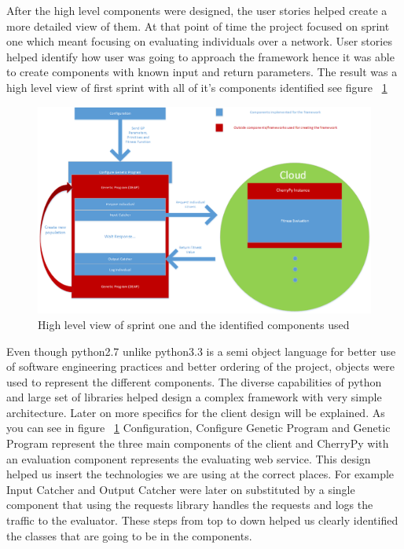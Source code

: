 After the high level components were designed, the user stories helped create a more detailed view of them. At that point of
time the project focused on sprint one which meant focusing on evaluating individuals over a network.
User stories helped identify how user was going to approach the framework hence it was able to create components with known
input and return parameters. The result was a high level view of first sprint with all of it's components identified see figure ~\ref{fig:firstSprint}

\begin{figure}[htp]
\centering
\includegraphics[scale=0.6]{Figures/FirstSprint.png}
\caption{High level view of sprint one and the identified components used}
\label{fig:firstSprint}
\end{figure}

Even though python2.7 unlike python3.3 is a semi object language for better use of software engineering practices and better ordering of the project,
objects were used to represent the different components. The diverse capabilities of python and large set of libraries helped design a complex framework with very simple architecture. Later on more 
specifics for the client design will be explained. As you can see in figure ~\ref{fig:firstSprint} Configuration, Configure Genetic Program and Genetic Program represent the three main components of the client and
CherryPy with an evaluation component represents the evaluating web service. This design helped us insert the technologies we are using at the correct
places. For example Input Catcher and Output Catcher were later on substituted by a single component that using the requests library handles the requests
and logs the traffic to the evaluator. These steps from top to down helped us clearly identified the classes that are going to be in the components.